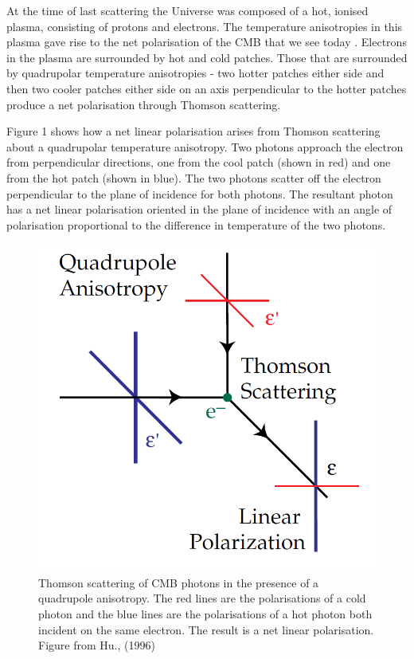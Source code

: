 At the time of last scattering the Universe was composed of a hot, ionised plasma, consisting of protons and electrons. The temperature anisotropies in this plasma gave rise to the net polarisation of the CMB that we see today \cite{Hu:1997hv}.
Electrons in the plasma are surrounded by hot and cold patches. Those that are surrounded by quadrupolar temperature anisotropies - two hotter patches either side and then two cooler patches either side on an axis perpendicular to the hotter patches produce a net polarisation through Thomson scattering.

Figure 1 shows how a net linear polarisation arises from Thomson scattering about a quadrupolar temperature anisotropy. Two photons approach the electron from perpendicular directions, one from the cool patch (shown in red) and one from the hot patch (shown in blue). The two photons scatter off the electron perpendicular to the plane of incidence for both photons. The resultant photon has a net linear polarisation oriented in the plane of incidence with an angle of polarisation proportional to the difference in temperature of the two photons. 

\begin{figure}[h]
\centering
\includegraphics[scale=0.35]{images/thomson.png}
\caption{Thomson scattering of CMB photons in the presence of a quadrupole anisotropy. The red lines are the polarisations of a cold photon and the blue lines are the polarisations of a hot photon both incident on the same electron. The result is a net linear polarisation. Figure from Hu., (1996) \cite{Hu:1997hv}}
\label{fig:thomson}
\end{figure}

